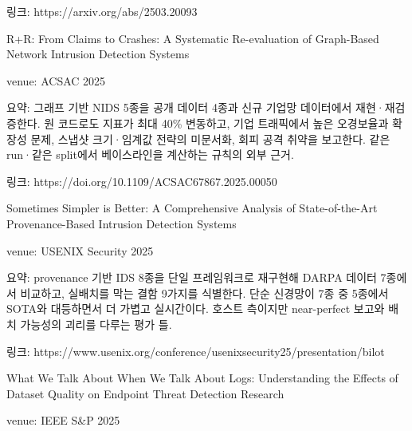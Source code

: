 \par\noindent \textbullet\enspace 링크: https:/\allowbreak{}/\allowbreak{}arxiv.org/\allowbreak{}abs/\allowbreak{}2503.20093



\par\noindent \textbullet\enspace R+\allowbreak{}R: From Claims to Crashes: A Systematic Re-evaluation of Graph-Based Network Intrusion Detection Systems


\par\noindent \textbullet\enspace venue: ACSAC 2025


\par\noindent \textbullet\enspace 요약: 그래프 기반 NIDS 5종을 공개 데이터 4종과 신규 기업망 데이터에서 재현·재검증한다. 원 코드로도 지표가 최대 40\% 변동하고, 기업 트래픽에서 높은 오경보율과 확장성 문제, 스냅샷 크기·임계값 전략의 미문서화, 회피 공격 취약을 보고한다. 같은 run·같은 split에서 베이스라인을 계산하는 규칙의 외부 근거.


\par\noindent \textbullet\enspace 링크: https:/\allowbreak{}/\allowbreak{}doi.org/\allowbreak{}10.1109/\allowbreak{}ACSAC67867.2025.00050


\par\noindent \textbullet\enspace Sometimes Simpler is Better: A Comprehensive Analysis of State-of-the-Art Provenance-Based Intrusion Detection Systems


\par\noindent \textbullet\enspace venue: USENIX Security 2025


\par\noindent \textbullet\enspace 요약: provenance 기반 IDS 8종을 단일 프레임워크로 재구현해 DARPA 데이터 7종에서 비교하고, 실배치를 막는 결함 9가지를 식별한다. 단순 신경망이 7종 중 5종에서 SOTA와 대등하면서 더 가볍고 실시간이다. 호스트 측이지만 near-perfect 보고와 배치 가능성의 괴리를 다루는 평가 틀.


\par\noindent \textbullet\enspace 링크: https:/\allowbreak{}/\allowbreak{}www.usenix.org/\allowbreak{}conference/\allowbreak{}usenixsecurity25/\allowbreak{}presentation/\allowbreak{}bilot


\par\noindent \textbullet\enspace What We Talk About When We Talk About Logs: Understanding the Effects of Dataset Quality on Endpoint Threat Detection Research


\par\noindent \textbullet\enspace venue: IEEE S\&P 2025


